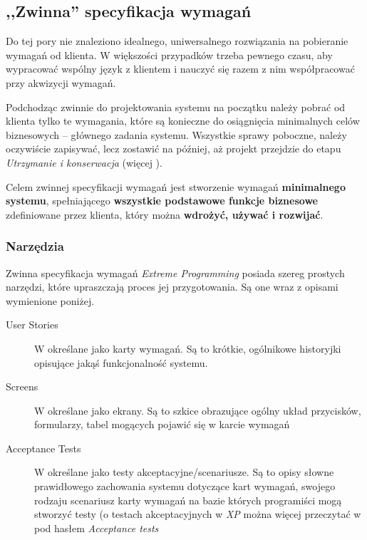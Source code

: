 \subsection{,,Zwinna'' specyfikacja wymagań}
\label{cha:ZMTOzwinnaSpecyfikacjaWymagan}

Do tej pory nie znaleziono idealnego, uniwersalnego rozwiązania na pobieranie wymagań od klienta. W większości przypadków trzeba pewnego czasu, aby wypracować wspólny język z klientem i nauczyć się razem z nim współpracować przy akwizycji wymagań.

Podchodząc zwinnie do projektowania systemu na początku należy pobrać od klienta tylko te wymagania, które są konieczne do osiągnięcia minimalnych celów biznesowych -- głównego zadania systemu. Wszystkie sprawy poboczne, należy oczywiście zapisywać, lecz zostawić na później, aż projekt przejdzie do etapu \textit{Utrzymanie i konserwacja} (więcej ).

Celem zwinnej specyfikacji wymagań jest stworzenie wymagań \textbf{minimalnego systemu}, spełniającego \textbf{wszystkie podstawowe funkcje biznesowe} zdefiniowane przez klienta, który można \textbf{wdrożyć, używać i rozwijać}.

\subsubsection{Narzędzia}
\label{sec:ZSWnarzedzia}

Zwinna specyfikacja wymagań \textit{Extreme Programming} posiada szereg prostych narzędzi, które upraszczają proces jej przygotowania. Są one wraz z opisami wymienione poniżej.

\begin{description}
    \item[User Stories]{W \cite{Mad09} określane jako karty wymagań. Są to krótkie, ogólnikowe historyjki opisujące jakąś funkcjonalność systemu.}
    \item[Screens]{W \cite{Mad09} określane jako ekrany. Są to szkice obrazujące ogólny układ przycisków, formularzy, tabel mogących pojawić się w karcie wymagań}
    \item[Acceptance Tests]{W \cite{Mad09} określane jako testy akceptacyjne/scenariusze. Są to opisy słowne prawidłowego zachowania systemu dotyczące kart wymagań, swojego rodzaju scenariusz karty wymagań na bazie których programiści mogą stworzyć testy (o testach akceptacyjnych w \textit{XP} można więcej przeczytać w \cite{Jef00} pod hasłem \textit{Acceptance tests}}
\end{description}

